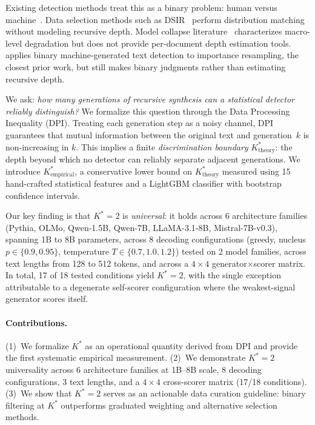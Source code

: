 \documentclass[11pt]{article}
\newcommand{\Kstar}{K^{*}}
\begin{document}
Existing detection methods treat this as a binary problem: human versus machine~\citep{mitchell2023detectgpt,bao2024fastdetectgpt}.
Data selection methods such as DSIR~\citep{xie2023dsir} perform distribution matching without modeling recursive depth.
Model collapse literature~\citep{shumailov2024model,dohmatob2024tale} characterizes macro-level degradation but does not provide per-document depth estimation tools.
\citet{drayson2025contamination} applies binary machine-generated text detection to importance resampling, the closest prior work, but still makes binary judgments rather than estimating recursive depth.

We ask: \emph{how many generations of recursive synthesis can a statistical detector reliably distinguish?}
We formalize this question through the Data Processing Inequality (DPI).
Treating each generation step as a noisy channel, DPI guarantees that mutual information between the original text and generation~$k$ is non-increasing in $k$.
This implies a finite \emph{discrimination boundary} $\Kstar_{\mathrm{theory}}$: the depth beyond which no detector can reliably separate adjacent generations.
We introduce $\Kstar_{\mathrm{empirical}}$, a conservative lower bound on $\Kstar_{\mathrm{theory}}$ measured using 15 hand-crafted statistical features and a LightGBM classifier with bootstrap confidence intervals.

Our key finding is that $\Kstar\!=\!2$ is \emph{universal}: it holds across 6 architecture families (Pythia, OLMo, Qwen-1.5B, Qwen-7B, LLaMA-3.1-8B, Mistral-7B-v0.3), spanning 1B to 8B parameters, across 8 decoding configurations (greedy, nucleus $p\!\in\!\{0.9, 0.95\}$, temperature $T\!\in\!\{0.7, 1.0, 1.2\}$) tested on 2 model families, across text lengths from 128 to 512 tokens, and across a $4\!\times\!4$ generator$\times$scorer matrix.
In total, 17 of 18 tested conditions yield $\Kstar\!=\!2$, with the single exception attributable to a degenerate self-scorer configuration where the weakest-signal generator scores itself.

\paragraph{Contributions.}
(1)~We formalize $\Kstar$ as an operational quantity derived from DPI and provide the first systematic empirical measurement.
(2)~We demonstrate $\Kstar\!=\!2$ universality across 6 architecture families at 1B--8B scale, 8 decoding configurations, 3 text lengths, and a $4\!\times\!4$ cross-scorer matrix (17/18 conditions).
(3)~We show that $\Kstar\!=\!2$ serves as an actionable data curation guideline: binary filtering at $\Kstar$ outperforms graduated weighting and alternative selection methods.
\end{document}
